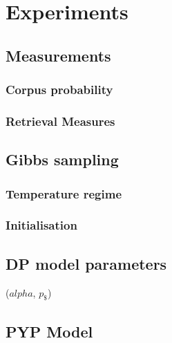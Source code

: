 \section{Experiments}

\subsection{Measurements}
\subsubsection{Corpus probability}
\subsubsection{Retrieval Measures}

\subsection{Gibbs sampling}

\subsubsection{Temperature regime}

\subsubsection{Initialisation}

\subsection{DP model parameters}
 ($alpha$, $p_\$$)

\subsection{PYP Model}